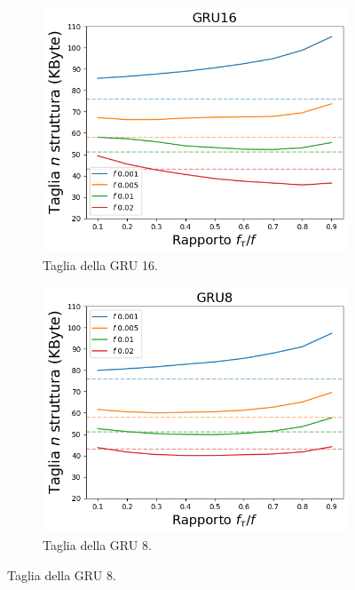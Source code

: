 \documentclass[../../main.tex]{subfiles}
\begin{document}
    \begin{figure}[H]
        \centering
        \begin{subfigure}[b]{0.32\textwidth}
            \centering
            \includegraphics[width = \textwidth]{immagini/7/LBF/GRU16_Taglia.png}
            \caption{Taglia della GRU 16.}
            \label{fig:LBFTagliaGRU16}
        \end{subfigure}
        \begin{subfigure}[b]{0.32\textwidth}
            \centering
            \includegraphics[width = \textwidth]{immagini/7/LBF/GRU8_Taglia.png}
            \caption{Taglia della GRU 8.}

\end{subfigure}
\end{figure}
\end{document}
